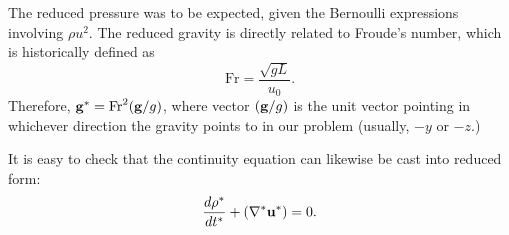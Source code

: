 The reduced pressure was to be expected, given the Bernoulli
expressions involving $\rho u^2$. The reduced gravity is directly
related to Froude's number, which is historically defined as
\[
\mathrm{Fr}=\frac{ \sqrt{gL}}{u_0}.
\]
Therefore, $ \mathbf{g}^* = \mathrm{Fr}^2 (\mathbf{g}/g) $, where vector $(\mathbf{g}/g)
$ is the unit vector pointing in whichever direction the gravity
points to in our problem (usually, $-y$ or $-z$.)


It is easy to check that the continuity equation can likewise be
cast into reduced form:
\[
\frac{d\rho^* }{dt^* }+
 ( \nabla^* \mathbf{u}^*) = 0 .
\]
